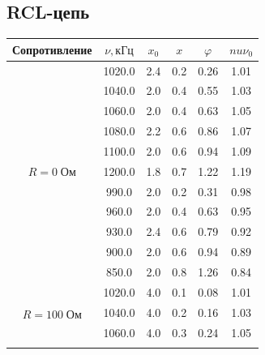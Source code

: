 \documentclass[a4paper, 12pt]{article}
\begin{document}
\subsection*{RCL-цепь}

\begin{table}[H]
\centering
\begin{tabular}{|c|c|c|c|c|c|}
\hline
Сопротивление & $\nu, \text{кГц}$ & $x_0$ & $x$ & $\varphi$ & $nu\nu_0$ \\ \hline
\multirow{11}{*}{$R = 0 \; \text{Ом}$}   & 1020.0            & 2.4   & 0.2 & 0.26   & 1.01      \\ \cline{2-6} 
                                         & 1040.0            & 2.0   & 0.4 & 0.55   & 1.03      \\ \cline{2-6} 
                                         & 1060.0            & 2.0   & 0.4 & 0.63   & 1.05      \\ \cline{2-6} 
                                         & 1080.0            & 2.2   & 0.6 & 0.86   & 1.07      \\ \cline{2-6} 
                                         & 1100.0            & 2.0   & 0.6 & 0.94   & 1.09      \\ \cline{2-6} 
                                         & 1200.0            & 1.8   & 0.7 & 1.22   & 1.19      \\ \cline{2-6} 
                                         & 990.0             & 2.0   & 0.2 & 0.31   & 0.98      \\ \cline{2-6} 
                                         & 960.0             & 2.0   & 0.4 & 0.63   & 0.95      \\ \cline{2-6} 
                                         & 930.0             & 2.4   & 0.6 & 0.79   & 0.92      \\ \cline{2-6} 
                                         & 900.0             & 2.0   & 0.6 & 0.94   & 0.89      \\ \cline{2-6} 
                                         & 850.0             & 2.0   & 0.8 & 1.26   & 0.84      \\ \hline
\multirow{13}{*}{$R = 100 \; \text{Ом}$} & 1020.0            & 4.0   & 0.1 & 0.08   & 1.01      \\ \cline{2-6} 
                                         & 1040.0            & 4.0   & 0.2 & 0.16   & 1.03      \\ \cline{2-6} 
                                         & 1060.0            & 4.0   & 0.3 & 0.24   & 1.05      \\ \cline{2-6} 

\end{tabular}
\end{table}
\end{document}
